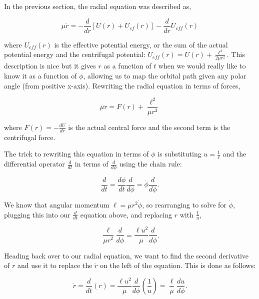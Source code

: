 
In the previous section, the radial equation was described as,

\begin{equation*}
    \mu \ddot{r} = -\frac{d}{dr}[U(r) + U_{cf}(r)] - \frac{d}{dr} U_{eff}(r)
\end{equation*}

\noindent where $U_{eff}(r)$ is the effective potential energy, or the sum of the actual potential energy and the centrifugal potential: $U_{eff}(r) = U(r) + \frac{\ell^2}{2 \mu r^2}$. This description is nice but it gives $r$ as a function of $t$ when we would really like to know it as a function of $\phi$, allowing us to map the orbital path given any polar angle (from positive x-axis). Rewriting the radial equation in terms of forces,

\begin{equation*}
    \mu \ddot{r} = F(r) + \frac{\ell^2}{\mu r^3}
\end{equation*}

\noindent where $F(r) = -\frac{dU}{dr}$ is the actual central force and the second term is the centrifugal force.

The trick to rewriting this equation in terms of $\phi$ is substituting $u = \frac{1}{r}$ and the differential operator $\frac{d}{dt}$ in terms of $\frac{d}{d\phi}$ using the chain rule:

\begin{equation*}
    \frac{d}{dt} = \frac{d\phi}{dt} \frac{d}{d\phi} = \dot{\phi} \frac{d}{d\phi}.
\end{equation*}

\noindent We know that angular momentum $\ell = \mu r^2 \dot{\phi}$, so rearranging to solve for $\dot{\phi}$, plugging this into our $\frac{d}{dt}$ equation above, and replacing $r$ with $\frac{1}{u}$,

\begin{equation*}
    \frac{\ell}{\mu r^2} \frac{d}{d\phi} = \frac{\ell u^2}{\mu} \frac{d}{d\phi}.
\end{equation*}

Heading back over to our radial equation, we want to find the second derivative of $r$ and use it to replace the $\ddot{r}$ on the left of the equation. This is done as follows:

\begin{equation*}
    \dot{r} = \frac{d}{dt}(r) = \frac{\ell u^2}{\mu} \frac{d}{d\phi} (\frac{1}{u}) = \frac{\ell}{\mu} \frac{du}{d\phi}.
\end{equation*}

